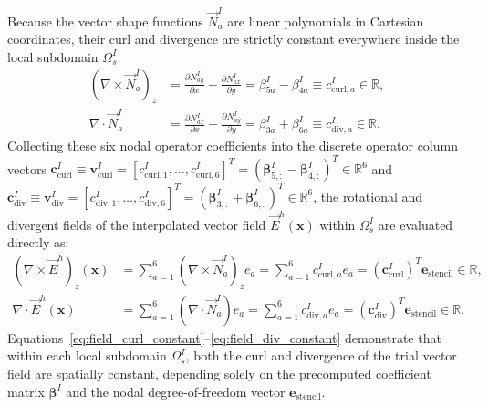 \documentclass[preprint,12pt]{elsarticle}
\begin{document}
Because the vector shape functions $\vec{N}_a^I$ are linear polynomials in Cartesian coordinates, their curl and divergence are strictly constant everywhere inside the local subdomain $\Omega_s^I$:
\begin{align}
    (\nabla \times \vec{N}_a^I)_z & = \frac{\partial N_{ay}^I}{\partial x} - \frac{\partial N_{ax}^I}{\partial y} = \beta_{5a}^I - \beta_{4a}^I \equiv c_{\mathrm{curl}, a}^I \in \mathbb{R}, \label{eq:curl_constant} \\
    \nabla \cdot \vec{N}_a^I      & = \frac{\partial N_{ax}^I}{\partial x} + \frac{\partial N_{ay}^I}{\partial y} = \beta_{3a}^I + \beta_{6a}^I \equiv c_{\mathrm{div}, a}^I \in \mathbb{R}. \label{eq:div_constant}
\end{align}
Collecting these six nodal operator coefficients into the discrete operator column vectors $\mathbf{c}_{\mathrm{curl}}^I \equiv \mathbf{v}_{\mathrm{curl}}^I = [c_{\mathrm{curl}, 1}^I, \dots, c_{\mathrm{curl}, 6}^I]^T = (\boldsymbol{\beta}_{5, :}^I - \boldsymbol{\beta}_{4, :}^I)^T \in \mathbb{R}^6$ and $\mathbf{c}_{\mathrm{div}}^I \equiv \mathbf{v}_{\mathrm{div}}^I = [c_{\mathrm{div}, 1}^I, \dots, c_{\mathrm{div}, 6}^I]^T = (\boldsymbol{\beta}_{3, :}^I + \boldsymbol{\beta}_{6, :}^I)^T \in \mathbb{R}^6$, the rotational and divergent fields of the interpolated vector field $\vec{E}^h(\mathbf{x})$ within $\Omega_s^I$ are evaluated directly as:
\begin{align}
    (\nabla \times \vec{E}^h)_z(\mathbf{x}) & = \sum_{a=1}^6 (\nabla \times \vec{N}_a^I)_z e_a = \sum_{a=1}^6 c_{\mathrm{curl}, a}^I e_a = (\mathbf{c}_{\mathrm{curl}}^I)^T \mathbf{e}_{\mathrm{stencil}} \in \mathbb{R}, \label{eq:field_curl_constant} \\
    \nabla \cdot \vec{E}^h(\mathbf{x})      & = \sum_{a=1}^6 (\nabla \cdot \vec{N}_a^I) e_a = \sum_{a=1}^6 c_{\mathrm{div}, a}^I e_a = (\mathbf{c}_{\mathrm{div}}^I)^T \mathbf{e}_{\mathrm{stencil}} \in \mathbb{R}. \label{eq:field_div_constant}
\end{align}
Equations~\eqref{eq:field_curl_constant}--\eqref{eq:field_div_constant} demonstrate that within each local subdomain $\Omega_s^I$, both the curl and divergence of the trial vector field are spatially constant, depending solely on the precomputed coefficient matrix $\boldsymbol{\beta}^I$ and the nodal degree-of-freedom vector $\mathbf{e}_{\mathrm{stencil}}$.
\end{document}
